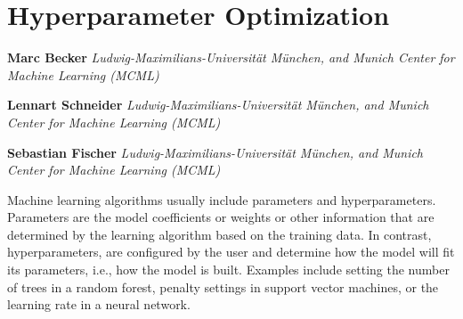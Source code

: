 \hypertarget{sec-optimization}{%
\chapter{Hyperparameter Optimization}\label{sec-optimization}}

\vspace{-15mm}

\textbf{Marc Becker} \newline  \emph{Ludwig-Maximilians-Universität
München, and Munich Center for Machine Learning (MCML)}

\textbf{Lennart Schneider} \newline 
\emph{Ludwig-Maximilians-Universität München, and Munich Center for
Machine Learning (MCML)}

\textbf{Sebastian Fischer} \newline 
\emph{Ludwig-Maximilians-Universität München, and Munich Center for
Machine Learning (MCML)} \newline \newline 

Machine learning algorithms usually include parameters
and
hyperparameters.
Parameters are the model
coefficients or weights or
other information that are determined by the learning algorithm based on
the training data. In contrast, hyperparameters, are configured by the
user and determine how the model will fit its parameters, i.e., how the
model is built. Examples include setting the number of trees in a random
forest, penalty settings in support vector machines, or the learning
rate in a neural network.

